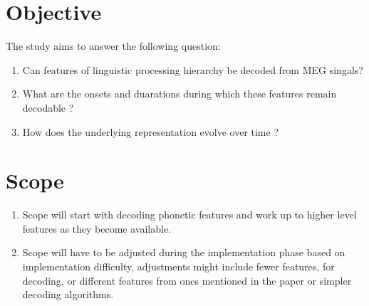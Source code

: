 \documentclass{tufte-handout}
\begin{document}
\section{Objective}

The study aims to answer the following question:

\begin{enumerate}
    \item Can features of linguistic processing hierarchy be decoded from MEG singals?
    \item What are the onsets and duarations during which these features remain decodable ? 
    \item How does the underlying representation evolve over time ?
\end{enumerate}


\section{Scope}

\begin{enumerate}
    \item Scope will start with decoding phonetic features and work up to higher level features as they become available.
    \item Scope will have to be adjusted during the implementation phase based on implementation difficulty, adjustments might include fewer features, for decoding, or different features from ones mentioned in the paper or simpler decoding algorithms.
\end{enumerate}

\end{document}
